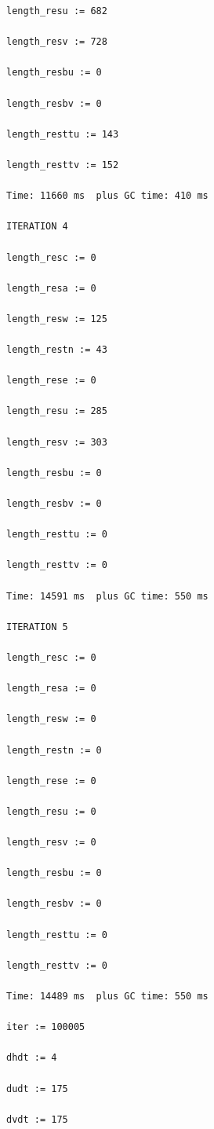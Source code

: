 \documentclass[12pt,a5paper]{article}
\begin{document}
\begin{verbatim}
length_resu := 682

length_resv := 728

length_resbu := 0

length_resbv := 0

length_resttu := 143

length_resttv := 152

Time: 11660 ms  plus GC time: 410 ms

ITERATION 4

length_resc := 0

length_resa := 0

length_resw := 125

length_restn := 43

length_rese := 0

length_resu := 285

length_resv := 303

length_resbu := 0

length_resbv := 0

length_resttu := 0

length_resttv := 0

Time: 14591 ms  plus GC time: 550 ms

ITERATION 5

length_resc := 0

length_resa := 0

length_resw := 0

length_restn := 0

length_rese := 0

length_resu := 0

length_resv := 0

length_resbu := 0

length_resbv := 0

length_resttu := 0

length_resttv := 0

Time: 14489 ms  plus GC time: 550 ms

iter := 100005

dhdt := 4

dudt := 175

dvdt := 175
\end{verbatim}




\end{document}

